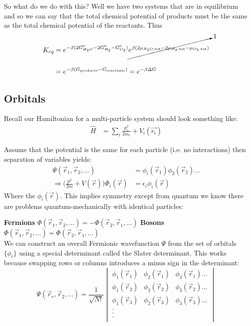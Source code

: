 \documentclass[a4paper, 11pt]{article}
\begin{document}
	So what do we do with this? Well we have two systems that are in equilibrium and so we can say that the total chemical potential of products must be the same as the total chemical potential of the reactants. Thus 
		\begin{align*}
			K_{eq} &= e^{-\beta(2G_{H_2O}^0-2G_{H_2}^0-G_{O_2}^0)}\cancelto{1}{e^{\beta(2\mu_{H_2O,\text{tot}}-2\mu_{H_2,\text{tot}}-\mu_{O_2,\text{tot}})}} \\
			& \\ 
			&= e^{-\beta(G_\text{products}-G_\text{reactants})}= e^{-\beta\Delta G}
		\end{align*}
		
		
\subsection*{Orbitals} 
	Recall our Hamiltonian for a multi-particle system should look something like: 
		\begin{align*}
			\hat{H} &= \sum_i \frac{p_i^2}{2m_i}+V_i(\vec{r_i})
		\end{align*}
		
	Assume that the potential is the same for each particle (i.e. no interactions) then separation of variables yields: 
		\begin{align*}
			\Psi(\vec{r}_1, \vec{r}_2, ...) &= \phi_i(\vec{r}_1)\phi_2(\vec{r}_2)... \\ 
			\Rightarrow \Big(\frac{p^2}{2m}+V(\vec{r})\Big)\Phi_i(\vec{r}) &= \epsilon_i\phi_i(\vec{r})
		\end{align*}
	Where the $\phi_i(\vec{r})$. This implies symmetry except from quantum we know there are problems quantum-mechanically with identical particles: 
	
	\textbf{Fermions} $\Phi(\vec{r}_1, \vec{r}_2, ...) = -\Phi(\vec{r}_2, \vec{r}_1, ...)$
	\textbf{Bosons} $\Phi(\vec{r}_1, \vec{r}_2, ...) = \Phi(\vec{r}_2, \vec{r}_1, ...)$ \\ 
	
	\noindent We can construct an overall Fermionic wavefunction $\Psi$ from the set of orbitals $\{\phi_i\}$ using a special determinant called the Slater determinant. This works because swapping rows or columns introduces a minus sign in the determinant: 
	\begin{equation*}
		\Psi(\vec{r}_r, \vec{r}_2, ...) = \frac{1}{\sqrt{N!}}
		\begin{vmatrix}
			\phi_1(\vec{r}_1) & \phi_2(\vec{r}_1) &\phi_3(\vec{r}_1) ... \\ 
			\phi_1(\vec{r}_2) & \phi_2(\vec{r}_2) &\phi_3(\vec{r}_2) ... \\ 
			\phi_1(\vec{r}_3) & \phi_2(\vec{r}_3) &\phi_3(\vec{r}_3) ... \\ 
			. & & \\ 
			. & & \\ 
			. & & \\ 
		\end{vmatrix}
	\end{equation*} 
	
\end{document}
